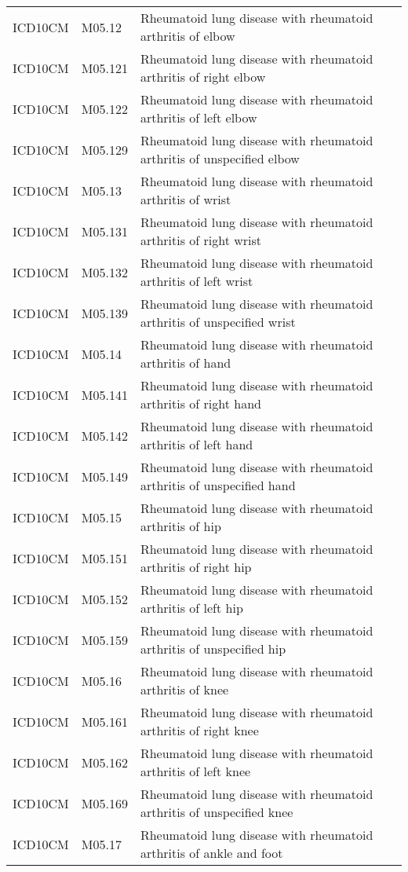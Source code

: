 \begin{table}[ht]
\begin{tabular}{lll}
  ICD10CM & M05.12 & Rheumatoid lung disease with rheumatoid arthritis of elbow \\ 
  ICD10CM & M05.121 & Rheumatoid lung disease with rheumatoid arthritis of right elbow \\ 
  ICD10CM & M05.122 & Rheumatoid lung disease with rheumatoid arthritis of left elbow \\ 
  ICD10CM & M05.129 & Rheumatoid lung disease with rheumatoid arthritis of unspecified elbow \\ 
  ICD10CM & M05.13 & Rheumatoid lung disease with rheumatoid arthritis of wrist \\ 
  ICD10CM & M05.131 & Rheumatoid lung disease with rheumatoid arthritis of right wrist \\ 
  ICD10CM & M05.132 & Rheumatoid lung disease with rheumatoid arthritis of left wrist \\ 
  ICD10CM & M05.139 & Rheumatoid lung disease with rheumatoid arthritis of unspecified wrist \\ 
  ICD10CM & M05.14 & Rheumatoid lung disease with rheumatoid arthritis of hand \\ 
  ICD10CM & M05.141 & Rheumatoid lung disease with rheumatoid arthritis of right hand \\ 
  ICD10CM & M05.142 & Rheumatoid lung disease with rheumatoid arthritis of left hand \\ 
  ICD10CM & M05.149 & Rheumatoid lung disease with rheumatoid arthritis of unspecified hand \\ 
  ICD10CM & M05.15 & Rheumatoid lung disease with rheumatoid arthritis of hip \\ 
  ICD10CM & M05.151 & Rheumatoid lung disease with rheumatoid arthritis of right hip \\ 
  ICD10CM & M05.152 & Rheumatoid lung disease with rheumatoid arthritis of left hip \\ 
  ICD10CM & M05.159 & Rheumatoid lung disease with rheumatoid arthritis of unspecified hip \\ 
  ICD10CM & M05.16 & Rheumatoid lung disease with rheumatoid arthritis of knee \\ 
  ICD10CM & M05.161 & Rheumatoid lung disease with rheumatoid arthritis of right knee \\ 
  ICD10CM & M05.162 & Rheumatoid lung disease with rheumatoid arthritis of left knee \\ 
  ICD10CM & M05.169 & Rheumatoid lung disease with rheumatoid arthritis of unspecified knee \\ 
  ICD10CM & M05.17 & Rheumatoid lung disease with rheumatoid arthritis of ankle and foot \\ 

\end{tabular}
\end{table}
